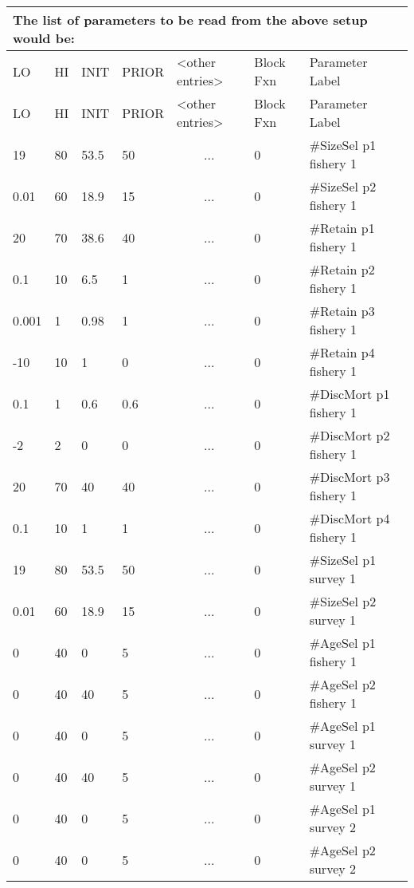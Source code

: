 \begin{longtable}{p{1cm} p{1cm} p{1cm}  p{1.5cm}  p{2.9cm}  p{1.9cm}  p{4.2cm}}
	\multicolumn{7}{l}{The list of parameters to be read from the above setup would be:}\\
	\hline
	LO \Tstrut & HI & INIT & PRIOR &  <other entries> & Block Fxn & Parameter Label\Bstrut\\
	\hline
	\endfirsthead

	\hline
	LO \Tstrut & HI & INIT & PRIOR & <other entries> & Block Fxn & Parameter Label\Bstrut\\
	\hline
	\endhead
		
	19    & 80   & 53.5 & 50  & \multicolumn{1}{c}{...}  & 0   & \#SizeSel p1 fishery 1\Tstrut\\
	0.01  & 60   & 18.9 & 15  & \multicolumn{1}{c}{...}  & 0   & \#SizeSel p2 fishery 1 \\
	20    & 70   & 38.6 & 40  & \multicolumn{1}{c}{...}  & 0   & \#Retain p1 fishery 1\\
	0.1   & 10   & 6.5  & 1   & \multicolumn{1}{c}{...}  & 0   & \#Retain p2 fishery 1\\
	0.001 & 1    & 0.98 & 1   & \multicolumn{1}{c}{...}  & 0   & \#Retain p3 fishery 1\\
	-10   & 10   & 1    & 0   & \multicolumn{1}{c}{...}  & 0   & \#Retain p4 fishery 1\\
	0.1   & 1    & 0.6  & 0.6 & \multicolumn{1}{c}{...}  & 0   & \#DiscMort p1 fishery 1\\
	-2    & 2    & 0    & 0   & \multicolumn{1}{c}{...}  & 0   & \#DiscMort p2 fishery 1\\
	20    & 70   & 40   & 40  & \multicolumn{1}{c}{...}  & 0   & \#DiscMort p3 fishery 1\\
	0.1   & 10   & 1    & 1   & \multicolumn{1}{c}{...}  & 0   & \#DiscMort p4 fishery 1\\
	19    & 80   & 53.5 & 50  & \multicolumn{1}{c}{...}  & 0   & \#SizeSel p1 survey 1\\
	0.01  & 60   & 18.9 & 15  & \multicolumn{1}{c}{...}  & 0   & \#SizeSel p2 survey 1 \\
	0     & 40   & 0    & 5   & \multicolumn{1}{c}{...}  & 0   & \#AgeSel p1 fishery 1\\
	0     & 40   & 40   & 5   & \multicolumn{1}{c}{...}  & 0   & \#AgeSel p2 fishery 1\\
	0     & 40   & 0    & 5   & \multicolumn{1}{c}{...}  & 0   & \#AgeSel p1 survey 1\\
	0     & 40   & 40   & 5   & \multicolumn{1}{c}{...}  & 0   & \#AgeSel p2 survey 1\\
	0     & 40   & 0    & 5   & \multicolumn{1}{c}{...}  & 0   & \#AgeSel p1 survey 2\\
	0     & 40   & 0    & 5   & \multicolumn{1}{c}{...}  & 0   & \#AgeSel p2 survey 2\Bstrut\\
	\hline
\end{longtable}



